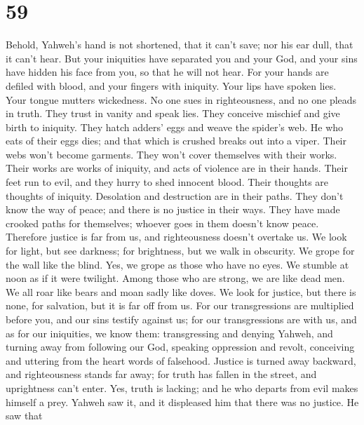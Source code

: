 \hypertarget{section-55}{%
\section{59}\label{section-55}}

 Behold, Yahweh's hand is not shortened, that it can't save;
nor his ear dull, that it can't hear.  But your iniquities
have separated you and your God, and your sins have hidden his face from
you, so that he will not hear.  For your hands are defiled
with blood, and your fingers with iniquity. Your lips have spoken lies.
Your tongue mutters wickedness.  No one sues in
righteousness, and no one pleads in truth. They trust in vanity and
speak lies. They conceive mischief and give birth to iniquity.
 They hatch adders' eggs and weave the spider's web. He who
eats of their eggs dies; and that which is crushed breaks out into a
viper.  Their webs won't become garments. They won't cover
themselves with their works. Their works are works of iniquity, and acts
of violence are in their hands.  Their feet run to evil, and
they hurry to shed innocent blood. Their thoughts are thoughts of
iniquity. Desolation and destruction are in their paths. 
They don't know the way of peace; and there is no justice in their ways.
They have made crooked paths for themselves; whoever goes in them
doesn't know peace.  Therefore justice is far from us, and
righteousness doesn't overtake us. We look for light, but see darkness;
for brightness, but we walk in obscurity.  We grope for the
wall like the blind. Yes, we grope as those who have no eyes. We stumble
at noon as if it were twilight. Among those who are strong, we are like
dead men.  We all roar like bears and moan sadly like
doves. We look for justice, but there is none, for salvation, but it is
far off from us.  For our transgressions are multiplied
before you, and our sins testify against us; for our transgressions are
with us, and as for our iniquities, we know them: 
transgressing and denying Yahweh, and turning away from following our
God, speaking oppression and revolt, conceiving and uttering from the
heart words of falsehood.  Justice is turned away backward,
and righteousness stands far away; for truth has fallen in the street,
and uprightness can't enter.  Yes, truth is lacking; and he
who departs from evil makes himself a prey. Yahweh saw it, and it
displeased him that there was no justice.  He saw that

